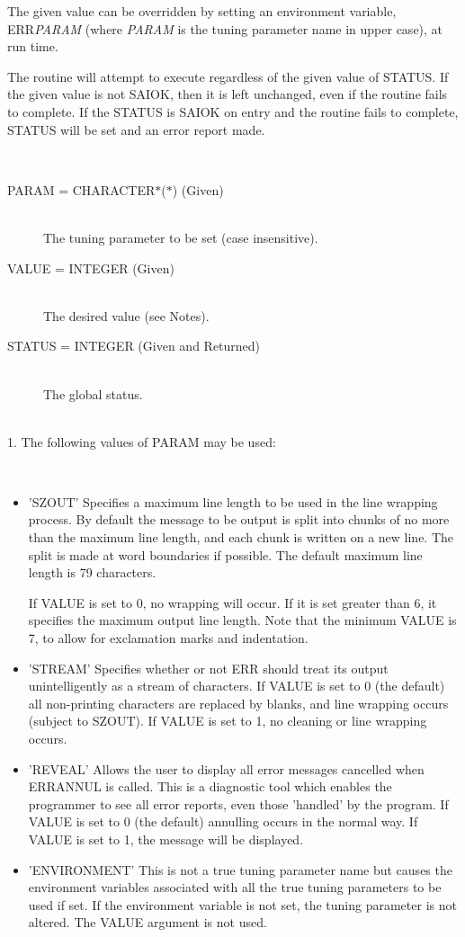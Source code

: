 \documentclass[twoside,11pt]{article}
\renewcommand{\_}{\texttt{\symbol{95}}}
\newcommand{\sstinvocation}[1]{\item[Invocation:]\hspace{0.4em}{\tt #1}}
\newcommand{\sstarguments}[1]{
   \item[Arguments:] \mbox{} \\
   \vspace{-3.5ex}
   \begin{description}
      #1
   \end{description}
}
\newcommand{\sstsubsection}[1]{ \item[{#1}] \mbox{} \\}
\newcommand{\sstnotes}[1]{\item[Notes:] \mbox{} \\[1.3ex] #1}
\newcommand{\sstitemlist}[1]{
  \mbox{} \\
  \vspace{-3.5ex}
  \begin{itemize}
     #1
  \end{itemize}
}
\newcommand{\sstitem}{\item}
\newcommand{\sstinvocation}[1]{\item[Invocation:]
      \begin{description}
         {\ssttt #1}
      \end{description}
      \\
   }
\newcommand{\sstarguments}[1]{
      \item[Arguments:] \\
      \begin{description}
         #1
      \end{description}
      \\
   }
\newcommand{\sstsubsection}[1]{\item[{#1}]}
\newcommand{\sstnotes}[1]{\item[Notes:] #1 }
\newcommand{\sstitemlist}[1]{
      \begin{itemize}
         #1
      \end{itemize}
      \\
   }
\newcommand{\sstitem}{\item}
\begin{document}
\begin {small}
{{      The given value can be overridden by setting an environment variable,
      ERR\_\textit{PARAM} (where \textit{PARAM} is the tuning parameter name
      in upper case), at run time.

      The routine will attempt to execute regardless of the given value of
      STATUS. If the given value is not SAI\_\_OK, then it is left unchanged,
      even if the routine fails to complete. If the STATUS is SAI\_\_OK on
      entry and the routine fails to complete, STATUS will be set and an
      error report made.
   }
   \sstinvocation{
      CALL ERR\_TUNE( PARAM, VALUE, STATUS )
   }
   \sstarguments{
      \sstsubsection{
         PARAM = CHARACTER$*$($*$) (Given)
      }{
         The tuning parameter to be set (case insensitive).
      }
      \sstsubsection{
         VALUE = INTEGER (Given)
      }{
         The desired value (see Notes).
      }
      \sstsubsection{
         STATUS = INTEGER (Given and Returned)
      }{
         The global status.
      }
   }
   \sstnotes{
      1. The following values of PARAM may be used:
      \sstitemlist{
      \sstitem{'SZOUT' Specifies a maximum line length to be used in the line
           wrapping process. By default the message to be output is split into
           chunks of no more than the maximum line length, and each chunk is
           written on a new line. The split is made at word boundaries if
           possible.
           The default maximum line length is 79 characters.

           If VALUE is set to 0, no wrapping will occur. If it is set greater
           than 6, it specifies the maximum output line length. Note that the
           minimum VALUE is 7, to allow for exclamation marks and indentation.
      }
      \sstitem{'STREAM' Specifies whether or not ERR should treat its output
           unintelligently as a stream of characters.
           If VALUE is set to 0 (the default) all non-printing characters are
           replaced by blanks, and line wrapping occurs (subject to SZOUT).
           If VALUE is set to 1, no cleaning or line wrapping occurs.
      }
      \sstitem{'REVEAL' Allows the user to display all error messages cancelled
           when ERR\_ANNUL is called. This is a diagnostic tool which enables
           the programmer to see all error reports, even those 'handled'
           by the program. If VALUE is set to 0 (the default) annulling
           occurs in the normal way. If VALUE is set to 1, the message
           will be displayed.
      }
      \sstitem{'ENVIRONMENT' This is not a true tuning parameter name but causes
           the environment variables associated with all the true tuning
           parameters to be used if set.  If the environment variable is
           not set, the tuning parameter is not altered. The VALUE argument
           is not used.
      }
      }

}}
\end{small}
\end{document}
